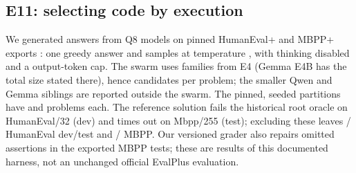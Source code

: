 \documentclass[11pt]{article}
\theoremstyle{definition}
\theoremstyle{remark}
\begin{document}
\subsection{E11: selecting code by execution}\label{sec:e11}
We generated \eElevenGenerations{} answers from \eElevenModels{} Q8 models on pinned HumanEval+ and MBPP+
exports \cite{liu2023evalplus,evalplushumaneval,evalplusmbpp}:
one greedy answer and \eElevenSamples{} samples at temperature \eElevenTemperature{}, with thinking
disabled and a \eElevenBudget{} output-token cap. The swarm uses \eElevenFamilies{} families from E4
(Gemma E4B has the total size stated there), hence \eElevenCandidates{} candidates per problem;
the smaller Qwen and Gemma siblings are reported outside the swarm. The pinned, seeded partitions have
\eElevenHumanRawN{} and \eElevenMbppRawN{} problems each. The reference solution fails the historical
root oracle on HumanEval/32 (dev) and times out on Mbpp/255 (test); excluding these leaves
\eElevenHumanDevN{}/\eElevenHumanN{} HumanEval dev/test and \eElevenMbppDevN{}/\eElevenMbppN{} MBPP.
Our versioned grader also repairs omitted assertions in the exported MBPP tests; these are results of
this documented harness, not an unchanged official EvalPlus evaluation.
\end{document}
